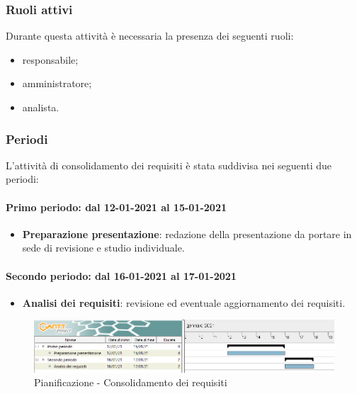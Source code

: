 \subsubsection{Ruoli attivi} 
Durante questa attività è necessaria la presenza dei seguenti ruoli: 
\begin{itemize} 
	\item responsabile; 
	\item amministratore; 
	\item analista. 
\end{itemize} 

\subsubsection{Periodi} 
L'attività di consolidamento dei requisiti è stata suddivisa nei seguenti due periodi: 

\paragraph{Primo periodo: dal 12-01-2021 al 15-01-2021} 
\begin{itemize} 
	\item \textbf{Preparazione presentazione}: redazione della presentazione da portare in sede di revisione e studio individuale. 
\end{itemize}	 

\paragraph{Secondo periodo: dal 16-01-2021 al 17-01-2021} 
\begin{itemize} 
	\item \textbf{Analisi dei requisiti}: revisione ed eventuale aggiornamento dei requisiti. 
\end{itemize} 

\newpage 

\begin{landscape} 
	\begin{figure}[h!] 
		\includegraphics[width=24cm]{images/2_Consolidamento_dei_requisiti.png} 
		\caption{Pianificazione - Consolidamento dei requisiti} 
	\end{figure} 
\end{landscape} 


